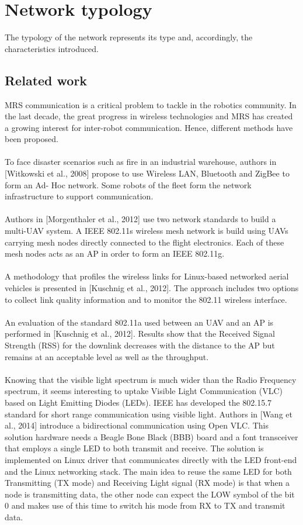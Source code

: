 \documentclass[11pt,openany]{book}
\begin{document}
\section{Network typology}
The typology of the network represents its type and, accordingly, the characteristics introduced.
\subsection{Related work}
MRS communication is a critical problem to tackle in the robotics community. In the last decade, the great progress in wireless technologies and MRS has created a growing interest for inter-robot communication. Hence, diﬀerent methods have been proposed.\\\\
To face disaster scenarios such as ﬁre in an industrial warehouse, authors in [Witkowski et al., 2008] propose to use Wireless LAN, Bluetooth and ZigBee to form an Ad- Hoc network. Some robots of the ﬂeet form the network infrastructure to support communication.\\\\
Authors in [Morgenthaler et al., 2012] use two network standards to build a multi-UAV system. A IEEE 802.11s wireless mesh network is build using UAVs carrying mesh nodes directly connected to the ﬂight electronics. Each of these mesh nodes acts as an AP in order to form an IEEE 802.11g.\\\\
A methodology that proﬁles the wireless links for Linux-based networked aerial vehicles is presented in [Kuschnig et al., 2012]. The approach includes two options to collect link quality information and to monitor the 802.11 wireless interface.\\\\
An evaluation of the standard 802.11a used between an UAV and an AP is performed in [Kuschnig et al., 2012]. Results show that the Received Signal Strength (RSS) for the downlink decreases with the distance to the AP but remains at an acceptable level as well as the throughput.\\\\
Knowing that the visible light spectrum is much wider than the Radio Frequency spectrum, it seems interesting to uptake Visible Light Communication (VLC) based on Light Emitting Diodes (LEDs). IEEE has developed the 802.15.7 standard for short range communication using visible light. Authors in [Wang et al., 2014] introduce a bidirectional communication using Open VLC. This solution hardware needs a Beagle Bone Black (BBB) board and a font transceiver that employs a single LED to both transmit and receive. The solution is implemented on Linux driver that communicates directly with the LED front-end and the Linux networking stack. The main idea to reuse the same LED for both Transmitting (TX mode) and Receiving Light signal (RX mode) is that when a node is transmitting data, the other node can expect the LOW symbol of the bit 0 and makes use of this time to switch his mode from RX to TX and transmit data.\\\\
\end{document}
